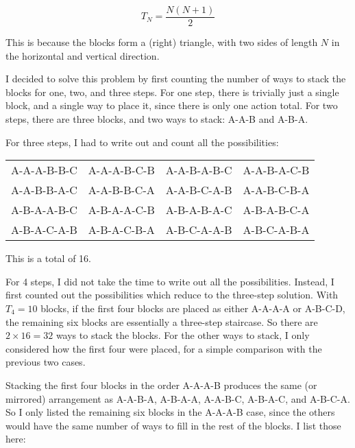 \documentclass{article}
\begin{document}
\[
T_{N}=\frac{N(N+1)}{2}
\]

This is because the blocks form a (right) triangle, with two sides of length $N$ in the horizontal and vertical direction.

I decided to solve this problem by first counting the number of ways to stack the blocks for one, two, and three steps.
For one step, there is trivially just a single block, and a single way to place it, since there is only one action total.
For two steps, there are three blocks, and two ways to stack: A-A-B and A-B-A.

For three steps, I had to write out and count all the possibilities:

\begin{center}
\begin{tabular}{cccc}
A-A-A-B-B-C & A-A-A-B-C-B & A-A-B-A-B-C & A-A-B-A-C-B \\
A-A-B-B-A-C & A-A-B-B-C-A & A-A-B-C-A-B & A-A-B-C-B-A \\
A-B-A-A-B-C & A-B-A-A-C-B & A-B-A-B-A-C & A-B-A-B-C-A \\
A-B-A-C-A-B & A-B-A-C-B-A & A-B-C-A-A-B & A-B-C-A-B-A
\end{tabular}
\end{center}

This is a total of 16.

For 4 steps, I did not take the time to write out all the possibilities.
Instead, I first counted out the possibilities which reduce to the three-step solution.
With $T_{4}=10$ blocks, if the first four blocks are placed as either A-A-A-A or A-B-C-D, the remaining six blocks are essentially a three-step staircase.
So there are $2\times16=32$ ways to stack the blocks.
For the other ways to stack, I only considered how the first four were placed, for a simple comparison with the previous two cases.

Stacking the first four blocks in the order A-A-A-B produces the same (or mirrored) arrangement as A-A-B-A, A-B-A-A, A-A-B-C, A-B-A-C, and A-B-C-A.
So I only listed the remaining six blocks in the A-A-A-B case, since the others would have the same number of ways to fill in the rest of the blocks.
I list those here:
\end{document}
